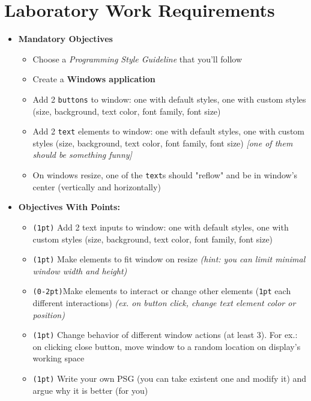 \documentclass[12pt,a4paper,titlepage]{article}
\begin{document}
\section{Laboratory Work Requirements}
\begin{itemize}
	\item \textbf{Mandatory Objectives}
	      \begin{itemize}
		      \item Choose a \textit{Programming Style Guideline} that you'll follow
		      \item Create a \textbf{Windows application}
		      \item Add 2 \texttt{buttons} to window: one with default styles, one with custom styles (size, background, text color, font family, font size)
		      \item Add 2 \texttt{text} elements to window: one with default styles, one with custom styles (size, background, text color, font family, font size) \textit{[one of them should be something funny]}
		      \item On windows resize, one of the \texttt{text}s should "reflow" and be in window's center (vertically and horizontally)
	      \end{itemize}
	\item \textbf{Objectives With Points:}
	      \begin{itemize}
		      \item \texttt{(1pt)} Add 2 text inputs to window: one with default styles, one with custom styles (size, background, text color, font family, font size)
		      \item \texttt{(1pt)} Make elements to fit window on resize \textit{(hint: you can limit minimal window width and height)}
		      \item \texttt{(0-2pt)}Make elements to interact or change other elements (\texttt{1pt} each different interactions) \textit{(ex. on button click, change text element color or position)}
		      \item \texttt{(1pt)} Change behavior of different window actions (at least 3). For ex.: on clicking close button, move window to a random location on display's working space
		      \item \texttt{(1pt)} Write your own PSG (you can take existent one and modify it) and argue why it is better (for you)
	      \end{itemize}
\end{itemize}

\clearpage
\cleardoublepage
\end{document}
